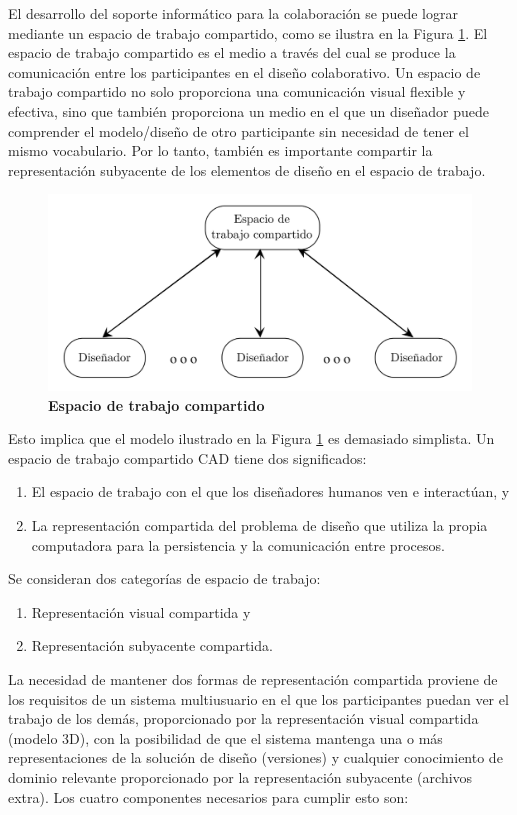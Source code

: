 El desarrollo del soporte informático para la colaboración se puede lograr mediante un espacio de trabajo compartido, como se ilustra en la Figura \ref{fig:espacio0}. El espacio de trabajo compartido es el medio a través del cual se produce la comunicación entre los participantes en el diseño colaborativo. Un espacio de trabajo compartido no solo proporciona una comunicación visual flexible y efectiva, sino que también proporciona un medio en el que un diseñador puede comprender el modelo/diseño de otro participante sin necesidad de tener el mismo vocabulario. Por lo tanto, también es importante compartir la representación subyacente de los elementos de diseño en el espacio de trabajo.

\begin{figure}[h]
\includegraphics[width=12cm]{Img/CPD/cad-shared0.png}
\centering
\caption{\textbf{\footnotesize{Espacio de trabajo compartido}}}
\label{fig:espacio0}
\end{figure}

Esto implica que el modelo ilustrado en la Figura \ref{fig:espacio0} es demasiado simplista. Un espacio de trabajo compartido CAD tiene dos significados:
\begin{enumerate}
\item El espacio de trabajo con el que los diseñadores humanos ven e interactúan, y
\item La representación compartida del problema de diseño que utiliza la propia computadora para la persistencia y la comunicación entre procesos.
\end{enumerate}

Se consideran dos categorías de espacio de trabajo:

\begin{enumerate}
    \item Representación visual compartida y
    \item Representación subyacente compartida.
\end{enumerate}
La necesidad de mantener dos formas de representación compartida proviene de los requisitos de un sistema multiusuario en el que los participantes puedan ver el trabajo de los demás, proporcionado por la representación visual compartida (modelo 3D), con la posibilidad de que el sistema mantenga una o más representaciones de la solución de diseño (versiones) y cualquier conocimiento de dominio relevante proporcionado por la representación subyacente (archivos extra). Los cuatro componentes necesarios para cumplir esto son:

